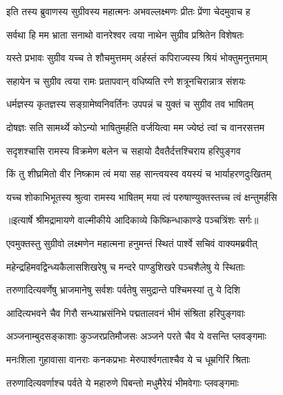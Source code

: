 \twolineshloka
{इति तस्य ब्रुवाणस्य सुग्रीवस्य महात्मनः}
{अभवल्लक्ष्मणः प्रीतः प्रेंणा चेदमुवाच ह} %

\twolineshloka
{सर्वथा हि मम भ्राता सनाथो वानरेश्वर}
{त्वया नाथेन सुग्रीव प्रश्रितेन विशेषतः} %

\twolineshloka
{यस्ते प्रभावः सुग्रीव यच्च ते शौचमुत्तमम्}
{अर्हस्तं कपिराज्यस्य श्रियं भोक्तुमनुत्तमाम्} %

\twolineshloka
{सहायेन च सुग्रीव त्वया रामः प्रतापवान्}
{वधिष्यति रणे शत्रूनचिरान्नात्र संशयः} %

\twolineshloka
{धर्मज्ञस्य कृतज्ञस्य सङ्ग्रामेष्वनिवर्तिनः}
{उपपन्नं च युक्तं च सुग्रीव तव भाषितम्} %

\twolineshloka
{दोषज्ञः सति सामर्थ्ये कोऽन्यो भाषितुमर्हति}
{वर्जयित्वा मम ज्येष्ठं त्वां च वानरसत्तम} %

\twolineshloka
{सदृशश्चासि रामस्य विक्रमेण बलेन च}
{सहायो दैवतैर्दत्तश्चिराय हरिपुङ्गव} %

\twolineshloka
{किं तु शीघ्रमितो वीर निष्क्राम त्वं मया सह}
{सान्त्वयस्व वयस्यं च भार्याहरणदुःखितम्} %

\twolineshloka
{यच्च शोकाभिभूतस्य श्रुत्वा रामस्य भाषितम्}
{मया त्वं परुषाण्युक्तस्तच्च त्वं क्षन्तुमर्हसि} %


{॥इत्यार्षे श्रीमद्रामायणे वाल्मीकीये आदिकाव्ये किष्किन्धाकाण्डे पञ्चत्रिंशः सर्गः॥}


\twolineshloka
{एवमुक्तस्तु सुग्रीवो लक्ष्मणेन महात्मना}
{हनुमन्तं स्थितं पार्श्वे सचिवं वाक्यमब्रवीत्} %

\twolineshloka
{महेन्द्रहिमवद्विन्ध्यकैलासशिखरेषु च}
{मन्दरे पाण्डुशिखरे पञ्चशैलेषु ये स्थिताः} %

\twolineshloka
{तरुणादित्यवर्णेषु भ्राजमानेषु सर्वशः}
{पर्वतेषु समुद्रान्ते पश्चिमस्यां तु ये दिशि} %

\twolineshloka
{आदित्यभवने चैव गिरौ सन्ध्याभ्रसंनिभे}
{पद्मतालवनं भीमं संश्रिता हरिपुङ्गवाः} %

\twolineshloka
{अञ्जनाम्बुदसङ्काशाः कुञ्जरप्रतिमौजसः}
{अञ्जने परते चैव ये वसन्ति प्लवङ्गमाः} %

\twolineshloka
{मनःशिला गुहावासा वानराः कनकप्रभाः}
{मेरुपार्श्वगताश्चैव ये च धूम्रगिरिं श्रिताः} %

\twolineshloka
{तरुणादित्यवर्णाश्च पर्वते ये महारुणे}
{पिबन्तो मधुमैरेयं भीमवेगाः प्लवङ्गमाः} %

